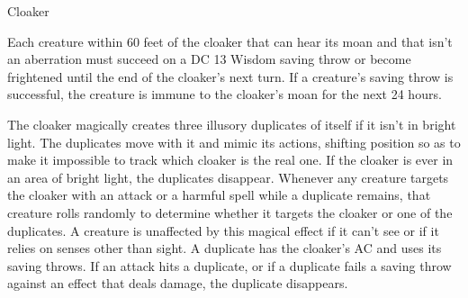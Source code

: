\begin{monsterbox}{Cloaker}
\begin{monsteraction}[Tail]
\end{monsteraction}
\begin{monsteraction}[Moan]
Each creature within 60 feet of the cloaker that can hear its moan and that isn't an aberration must succeed on a DC 13 Wisdom saving throw or become frightened until the end of the cloaker's next turn. If a creature's saving throw is successful, the creature is immune to the cloaker's moan for the next 24 hours.
\end{monsteraction}
\begin{monsteraction}
The cloaker magically creates three illusory duplicates of itself if it isn't in bright light. The duplicates move with it and mimic its actions, shifting position so as to make it impossible to track which cloaker is the real one. If the cloaker is ever in an area of bright light, the duplicates disappear.
Whenever any creature targets the cloaker with an attack or a harmful spell while a duplicate remains, that creature rolls randomly to determine whether it targets the cloaker or one of the duplicates. A creature is unaffected by this magical effect if it can't see or if it relies on senses other than sight.
A duplicate has the cloaker's AC and uses its saving throws. If an attack hits a duplicate, or if a duplicate fails a saving throw against an effect that deals damage, the duplicate disappears.
\end{monsteraction}
\end{monsterbox}